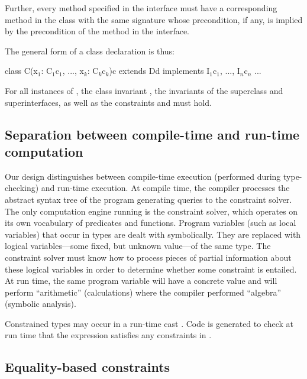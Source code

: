 Further, every method specified in the interface must have a
corresponding method in the class with the same signature whose
precondition, if any, is implied by the precondition of the method in
the interface.

The general form of a class declaration is thus:
\begin{xten}
class C(x$_1$: C$_1${c$_1$}, ..., x$_k$: C$_k${c$_k$}){c}
  extends D{d}
  implements I$_1${c$_1$}, ..., I$_n${c$_n$} {...}
\end{xten}
\noindent
For all instances of , the class invariant ,
the invariants of the superclass and superinterfaces,
as well as the constraints  and  must hold.

\subsection{Separation between compile-time and run-time computation}

Our design distinguishes between compile-time execution (performed
during type-checking) and run-time execution. At compile time, the
compiler processes the abstract syntax tree of the program generating
queries to the constraint solver. The only computation engine running
is the constraint solver, which operates on its own vocabulary of
predicates and functions. Program variables (such as local variables)
that occur in types are dealt with symbolically. They are replaced
with logical variables---some fixed, but unknown value---of the same
type. The constraint solver must know how to process pieces of partial
information about these logical variables in order to determine
whether some constraint is entailed. At run time, the same program
variable will have a concrete value and will perform ``arithmetic''
(calculations) where the compiler performed ``algebra'' (symbolic
analysis).

Constrained types may occur in a run-time cast .  Code is
generated to check at run time that the expression 
satisfies any constraints in .

\subsection{Equality-based constraints}

